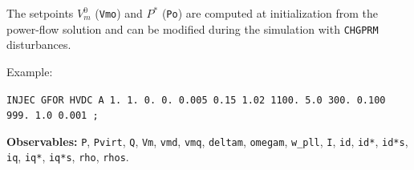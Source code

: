 \documentclass[11pt,a4paper]{article}
\begin{document}
The setpoints $V_m^0$ ({\tt Vmo}) and $P^\ast$ ({\tt Po}) are computed at
initialization from the power-flow solution and can be modified during the
simulation with {\tt CHGPRM} disturbances.

Example:

{\tt INJEC GFOR HVDC A 1. 1. 0. 0. 0.005 0.15 1.02 1100. 5.0 300. 0.100 999. 1.0 0.001 ;}

{\bf Observables:} {\tt P}, {\tt Pvirt}, {\tt Q}, {\tt Vm}, {\tt vmd},
{\tt vmq}, {\tt deltam}, {\tt omegam}, {\tt w\_pll}, {\tt I}, {\tt id},
{\tt id*}, {\tt id*s}, {\tt iq}, {\tt iq*}, {\tt iq*s}, {\tt rho}, {\tt rhos}.
\end{document}
